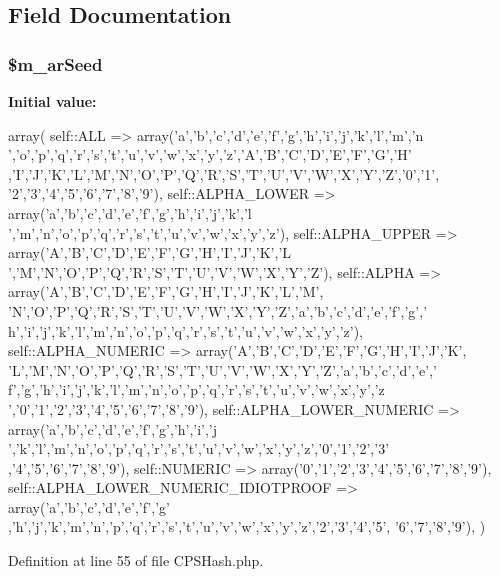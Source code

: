 \subsection{Field Documentation}
\hypertarget{classCPSHash_ad0ea7d21fa77c2440dae6c36137c1531}{
\subsubsection[{\$m\_\-arSeed}]{\setlength{\rightskip}{0pt plus 5cm}\$m\_\-arSeed}}
\label{classCPSHash_ad0ea7d21fa77c2440dae6c36137c1531}
{\bfseries Initial value:}
\begin{DoxyCode}
 array(
        self::ALL => array('a','b','c','d','e','f','g','h','i','j','k','l','m','n
      ','o','p','q','r','s','t','u','v','w','x','y','z','A','B','C','D','E','F','G','H'
      ,'I','J','K','L','M','N','O','P','Q','R','S','T','U','V','W','X','Y','Z','0','1',
      '2','3','4','5','6','7','8','9'),
        self::ALPHA_LOWER => array('a','b','c','d','e','f','g','h','i','j','k','l
      ','m','n','o','p','q','r','s','t','u','v','w','x','y','z'),
        self::ALPHA_UPPER => array('A','B','C','D','E','F','G','H','I','J','K','L
      ','M','N','O','P','Q','R','S','T','U','V','W','X','Y','Z'),
        self::ALPHA => array('A','B','C','D','E','F','G','H','I','J','K','L','M',
      'N','O','P','Q','R','S','T','U','V','W','X','Y','Z','a','b','c','d','e','f','g','
      h','i','j','k','l','m','n','o','p','q','r','s','t','u','v','w','x','y','z'),
        self::ALPHA_NUMERIC => array('A','B','C','D','E','F','G','H','I','J','K',
      'L','M','N','O','P','Q','R','S','T','U','V','W','X','Y','Z','a','b','c','d','e','
      f','g','h','i','j','k','l','m','n','o','p','q','r','s','t','u','v','w','x','y','z
      ','0','1','2','3','4','5','6','7','8','9'),
        self::ALPHA_LOWER_NUMERIC => array('a','b','c','d','e','f','g','h','i','j
      ','k','l','m','n','o','p','q','r','s','t','u','v','w','x','y','z','0','1','2','3'
      ,'4','5','6','7','8','9'),
        self::NUMERIC => array('0','1','2','3','4','5','6','7','8','9'),
        self::ALPHA_LOWER_NUMERIC_IDIOTPROOF => array('a','b','c','d','e','f','g'
      ,'h','j','k','m','n','p','q','r','s','t','u','v','w','x','y','z','2','3','4','5',
      '6','7','8','9'),
    )
\end{DoxyCode}


Definition at line 55 of file CPSHash.php.

